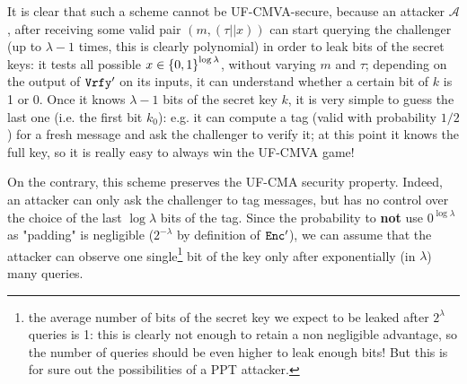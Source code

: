 \begin{enumerate}[(a)]
\begin{enumerate}[(i)]
\begin{solution}
		It is clear that such a scheme cannot be UF-CMVA-secure, because an attacker $\mathcal{A}$, after receiving some valid pair $(m, (\tau || x))$ can start querying the challenger (up to $\lambda - 1$ times, this is clearly polynomial) in order to leak bits of the secret keys: it tests all possible $x \in {\{0, 1\}}^{\log \lambda}$, without varying $m$ and $\tau$; depending on the output of $\texttt{Vrfy}'$ on its inputs, it can understand whether a certain bit of $k$ is 1 or 0. Once it knows $\lambda - 1$ bits of the secret key $k$, it is very simple to guess the last one (i.e. the first bit $k_0$): e.g. it can compute a tag (valid with probability $1/2$) for a fresh message and ask the challenger to verify it; at this point it knows the full key, so it is really easy to always win the UF-CMVA game!

		On the contrary, this scheme preserves the UF-CMA security property. Indeed, an attacker can only ask the challenger to tag messages, but has no control over the choice of the last $\log \lambda$ bits of the tag. Since the probability to \textbf{not} use $0^{\log \lambda}$ as "padding" is negligible ($2^{-\lambda}$ by definition of $\texttt{Enc}'$), we can assume that the attacker can observe one single\footnote{the average number of bits of the secret key we expect to be leaked after $2^\lambda$ queries is 1: this is clearly not enough to retain a non negligible advantage, so the number of queries should be even higher to leak enough bits! But this is for sure out the possibilities of a PPT attacker.} bit of the key only after exponentially (in $\lambda$) many queries.
		\end{solution}
	\end{enumerate}	
\end{enumerate}